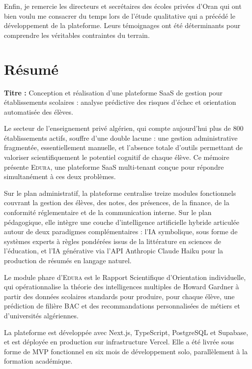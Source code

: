 \documentclass[12pt,a4paper,oneside]{report}
\newcommand{\edura}{\textsc{Edura}}
\begin{document}
Enfin, je remercie les directeurs et secrétaires des écoles privées d'Oran qui ont bien voulu me consacrer du temps lors de l'étude qualitative qui a précédé le développement de la plateforme. Leurs témoignages ont été déterminants pour comprendre les véritables contraintes du terrain.

\chapter*{Résumé}
\thispagestyle{plain}

\noindent\textbf{Titre :} Conception et réalisation d'une plateforme SaaS de gestion pour établissements scolaires : analyse prédictive des risques d'échec et orientation automatisée des élèves.

\vspace{8pt}

Le secteur de l'enseignement privé algérien, qui compte aujourd'hui plus de 800 établissements actifs, souffre d'une double lacune : une gestion administrative fragmentée, essentiellement manuelle, et l'absence totale d'outils permettant de valoriser scientifiquement le potentiel cognitif de chaque élève. Ce mémoire présente \edura{}, une plateforme SaaS multi-tenant conçue pour répondre simultanément à ces deux problèmes.

Sur le plan administratif, la plateforme centralise treize modules fonctionnels couvrant la gestion des élèves, des notes, des présences, de la finance, de la conformité réglementaire et de la communication interne. Sur le plan pédagogique, elle intègre une couche d'intelligence artificielle hybride articulée autour de deux paradigmes complémentaires : l'IA symbolique, sous forme de systèmes experts à règles pondérées issus de la littérature en sciences de l'éducation, et l'IA générative via l'API Anthropic Claude Haiku pour la production de résumés en langage naturel.

Le module phare d'\edura{} est le Rapport Scientifique d'Orientation individuelle, qui opérationnalise la théorie des intelligences multiples de Howard Gardner \autocite{gardner1983frames} à partir des données scolaires standards pour produire, pour chaque élève, une prédiction de filière BAC et des recommandations personnalisées de métiers et d'universités algériennes.

La plateforme est développée avec Next.js, TypeScript, PostgreSQL et Supabase, et est déployée en production sur infrastructure Vercel. Elle a été livrée sous forme de MVP fonctionnel en six mois de développement solo, parallèlement à la formation académique.
\end{document}
